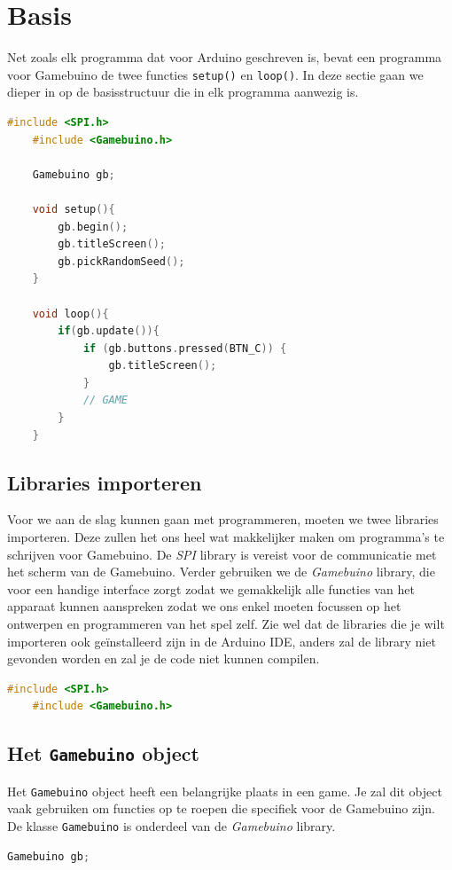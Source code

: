 \documentclass[a4paper,titlepage,12pt]{article}
\begin{document}
	\section{Basis}
	Net zoals elk programma dat voor Arduino geschreven is, bevat een programma voor Gamebuino de twee functies \texttt{setup()} en \texttt{loop()}. In deze sectie gaan we dieper in op de basisstructuur die in elk programma aanwezig is.
	
	\begin{lstlisting}[language=C++, caption=Structuur van een Gamebuino programma]
	#include <SPI.h>
	#include <Gamebuino.h>
	
	Gamebuino gb;
	
	void setup(){
		gb.begin();
		gb.titleScreen();
		gb.pickRandomSeed();
	}
	
	void loop(){
		if(gb.update()){
			if (gb.buttons.pressed(BTN_C)) {
				gb.titleScreen();
			}
			// GAME
		}
	}
	\end{lstlisting}
	
	
	\subsection{Libraries importeren}
	Voor we aan de slag kunnen gaan met programmeren, moeten we twee libraries importeren. Deze zullen het ons heel wat makkelijker maken om programma's te schrijven voor Gamebuino. De \emph{SPI} library is vereist voor de communicatie met het scherm van de Gamebuino. Verder gebruiken we de \emph{Gamebuino} library, die voor een handige interface zorgt zodat we gemakkelijk alle functies van het apparaat kunnen aanspreken zodat we ons enkel moeten focussen op het ontwerpen en programmeren van het spel zelf.
	Zie wel dat de libraries die je wilt importeren ook geïnstalleerd zijn in de Arduino IDE, anders zal de library niet gevonden worden en zal je de code niet kunnen compilen.
	\begin{lstlisting}[language=C++, caption={Importeren van libraries}]
	#include <SPI.h>
	#include <Gamebuino.h>
	\end{lstlisting}
	
	
	\subsection{Het \texttt{Gamebuino} object}
	Het \texttt{Gamebuino} object heeft een belangrijke plaats in een game. Je zal dit object vaak gebruiken om functies op te roepen die specifiek voor de Gamebuino zijn. De klasse \texttt{Gamebuino} is onderdeel van de \emph{Gamebuino} library.
	\begin{lstlisting}[language=C++, caption={Aanmaken van een \texttt{Gamebuino} object}]
	Gamebuino gb;
	\end{lstlisting}
	
\end{document}
